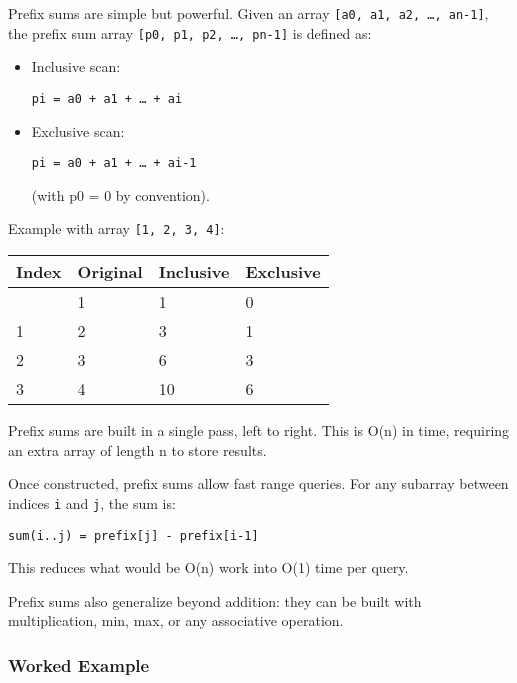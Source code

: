 \documentclass[
  letterpaper,
  DIV=11,
  numbers=noendperiod]{scrreprt}
\begin{document}
Prefix sums are simple but powerful. Given an array
\texttt{{[}a0,\ a1,\ a2,\ …,\ an-1{]}}, the prefix sum array
\texttt{{[}p0,\ p1,\ p2,\ …,\ pn-1{]}} is defined as:

\begin{itemize}
\item
  Inclusive scan:

\begin{verbatim}
pi = a0 + a1 + … + ai
\end{verbatim}
\item
  Exclusive scan:

\begin{verbatim}
pi = a0 + a1 + … + ai-1
\end{verbatim}

  (with p0 = 0 by convention).
\end{itemize}

Example with array \texttt{{[}1,\ 2,\ 3,\ 4{]}}:

\begin{longtable}[]{@{}llll@{}}
\toprule\noalign{}
Index & Original & Inclusive & Exclusive \\
\midrule\noalign{}
\endhead
\bottomrule\noalign{}
\endlastfoot
0 & 1 & 1 & 0 \\
1 & 2 & 3 & 1 \\
2 & 3 & 6 & 3 \\
3 & 4 & 10 & 6 \\
\end{longtable}

Prefix sums are built in a single pass, left to right. This is O(n) in
time, requiring an extra array of length n to store results.

Once constructed, prefix sums allow fast range queries. For any subarray
between indices \texttt{i} and \texttt{j}, the sum is:

\begin{verbatim}
sum(i..j) = prefix[j] - prefix[i-1]
\end{verbatim}

This reduces what would be O(n) work into O(1) time per query.

Prefix sums also generalize beyond addition: they can be built with
multiplication, min, max, or any associative operation.

\subsubsection{Worked Example}\label{worked-example-10}
\end{document}
